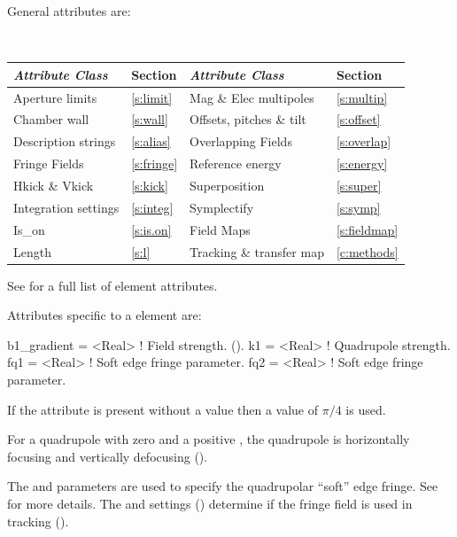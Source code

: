 {General  attributes are:
\begin{center}
\tt
\begin{tabular}{llll} \toprule
  {\sl Attribute Class}      & Section           & {\sl Attribute Class}      & Section            \\ \midrule
  Aperture limits            & \ref{s:limit}     & Mag \& Elec multipoles     & \ref{s:multip}     \\
  Chamber wall               & \ref{s:wall}      & Offsets, pitches \& tilt   & \ref{s:offset}     \\
  Description strings        & \ref{s:alias}     & Overlapping Fields         & \ref{s:overlap}    \\
  Fringe Fields              & \ref{s:fringe}    & Reference energy           & \ref{s:energy}     \\ 
  Hkick \& Vkick             & \ref{s:kick}      & Superposition              & \ref{s:super}      \\
  Integration settings       & \ref{s:integ}     & Symplectify                & \ref{s:symp}       \\
  Is_on                      & \ref{s:is.on}     & Field Maps                 & \ref{s:fieldmap}   \\ 
  Length                     & \ref{s:l}         & Tracking \& transfer map   & \ref{c:methods}    \\ 
  \bottomrule
\end{tabular}
\end{center}
\toffset
See  for a full list of element attributes.

Attributes specific to a  element are:
\begin{example}
  b1_gradient    = <Real>    ! Field strength. ().
  k1             = <Real>    ! Quadrupole strength.
  fq1            = <Real>    ! Soft edge fringe parameter.
  fq2            = <Real>    ! Soft edge fringe parameter.
 \end{example}

If the  attribute is present without a value then a value of $\pi/4$
is used.

For a quadrupole with zero  and a positive , the
quadrupole is horizontally focusing and vertically defocusing
().

The  and  parameters are used to specify the
quadrupolar ``soft'' edge fringe. See  for more details.
The  and  settings ()
determine if the fringe field is used in tracking ().

}
